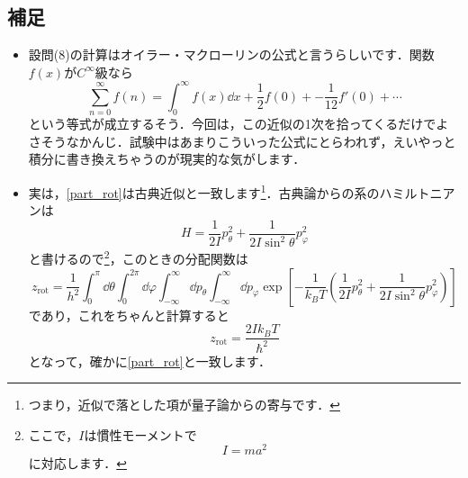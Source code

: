 \documentclass[a4paper,pdflatex,ja=standard]{bxjsarticle}
\begin{document}
\subsection*{補足}
\begin{itemize}
  \item 
  設問(8)の計算はオイラー・マクローリンの公式と言うらしいです．関数$f(x)$が$C^{\infty}$級なら
  \begin{equation}
    \sum_{n=0}^{\infty}f(n)
    =
    \int_{0}^{\infty}f(x)\dd x
    +
    \frac{1}{2}f(0)
    +
    -\frac{1}{12}f'(0)
    +
    \cdots
    \label{EulerMac}
  \end{equation}
  という等式が成立するそう．今回は，この近似の1次を拾ってくるだけでよさそうなかんじ．試験中はあまりこういった公式にとらわれず，えいやっと積分に書き換えちゃうのが現実的な気がします．

  \item 
  実は，\eqref{part_rot}は古典近似と一致します\footnote{
    つまり，近似で落とした項が量子論からの寄与です．
  }．古典論からの系のハミルトニアンは
  \begin{equation}
    H
    =
    \frac{1}{2I}p_{\theta}^2
    +
    \frac{1}{2I\sin^2\theta}p_{\varphi}^2
  \end{equation}
  と書けるので\footnote{
    ここで，$I$は慣性モーメントで
    \begin{equation}
      I
      =
      ma^2
    \end{equation}
    に対応します．
  }，このときの分配関数は
  \begin{equation}
    z_{\text{rot}}
    =
    \frac{1}{h^2}
    \int_{0}^{\pi}\dd \theta\int_{0}^{2\pi}\dd\varphi
    \int_{-\infty}^{\infty}\dd p_{\theta}\int_{-\infty}^{\infty}\dd p_{\varphi}
    \exp\left[ -\frac{1}{k_{B}T}\left( \frac{1}{2I}p_{\theta}^2
    +
    \frac{1}{2I\sin^2\theta}p_{\varphi}^2 \right) \right]
  \end{equation}
  であり，これをちゃんと計算すると
  \begin{equation}
    z_{\text{rot}}
    =
    \frac{2Ik_{B}T}{\hbar^2}
  \end{equation}
  となって，確かに\eqref{part_rot}と一致します．

\end{itemize}
\end{document}
